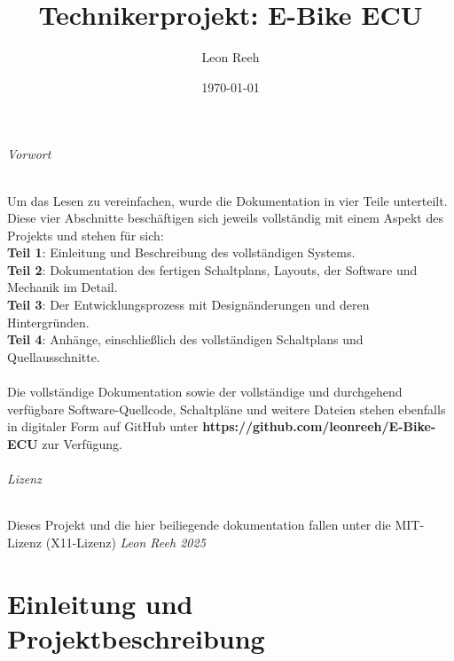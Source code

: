 \documentclass[paper=a4,11pt]{scrreprt}
\title{Technikerprojekt: E-Bike ECU}
\author{Leon Reeh}
\date{\today}
\begin{document}
\maketitle
\paragraph{Vorwort}
Um das Lesen zu vereinfachen, wurde die Dokumentation in vier Teile unterteilt. Diese vier Abschnitte beschäftigen sich jeweils vollständig mit einem Aspekt des Projekts und stehen für sich:\\
\textbf{Teil 1}: Einleitung und Beschreibung des vollständigen Systems.\\ 
\textbf{Teil 2}: Dokumentation des fertigen Schaltplans, Layouts, der Software und Mechanik im Detail. \\
\textbf{Teil 3}: Der Entwicklungsprozess mit Designänderungen und deren Hintergründen.\\ 
\textbf{Teil 4}: Anhänge, einschließlich des vollständigen Schaltplans und Quellausschnitte.\\
\\Die vollständige Dokumentation sowie der vollständige und durchgehend verfügbare Software-Quellcode, Schaltpläne und weitere Dateien stehen ebenfalls in digitaler Form auf GitHub unter \textbf{https://github.com/leonreeh/E-Bike-ECU} zur Verfügung.
\paragraph{Lizenz}
Dieses Projekt und die hier beiliegende dokumentation fallen unter die MIT-Lizenz (X11-Lizenz) \emph{Leon Reeh 2025} 

\tableofcontents
\newpage


\part{Einleitung und Projektbeschreibung}
\end{document}
